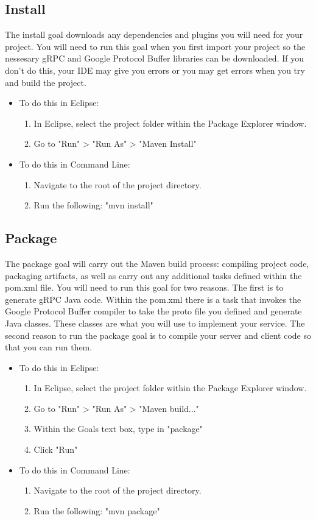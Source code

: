 \documentclass{article}
\begin{document}
\subsection{Install}
The install goal downloads any dependencies and plugins you will need for your project. You will need to run this goal when you first import your project so the nessesary gRPC and Google Protocol Buffer libraries can be downloaded. If you don't do this, your IDE may give you errors or you may get errors when you try and build the project. 
\begin{itemize}
\item To do this in Eclipse:
	\begin{enumerate}
	\item In Eclipse, select the project folder within the Package Explorer window.
	\item Go to "Run" > "Run As" > "Maven Install"
	\end{enumerate}
\item To do this in Command Line:
	\begin{enumerate}
	\item Navigate to the root of the project directory.
	\item Run the following: "mvn install"
	\end{enumerate}
\end{itemize}

\subsection{Package}
The package goal will carry out the Maven build process: compiling project code, packaging artifacts, as well as carry out any additional tasks defined within the pom.xml file. You will need to run this goal for two reasons. The first is to generate gRPC Java code. Within the pom.xml there is a task that invokes the Google Protocol Buffer compiler to take the proto file you defined and generate Java classes. These classes are what you will use to implement your service. The second reason to run the package goal is to compile your server and client code so that you can run them.
\begin{itemize}
\item To do this in Eclipse:
	\begin{enumerate}
	\item In Eclipse, select the project folder within the Package Explorer window.
	\item Go to "Run" > "Run As" > "Maven build..."
	\item Within the Goals text box, type in "package"
	\item Click "Run" 
	\end{enumerate}
\item To do this in Command Line:
	\begin{enumerate}
	\item Navigate to the root of the project directory.
	\item Run the following: "mvn package"
	\end{enumerate}
\end{itemize}
\end{document}
